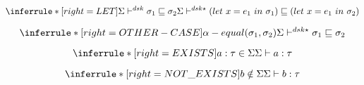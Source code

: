 \[
\inferrule*[right=LET]
{
\Sigma \polymorphic  \sigma_1 \sqsubseteq \sigma_2}
{\Sigma \polymorphicstar  (let\ x = e_1\ in\ \sigma_1) \sqsubseteq  (let\ x = e_1\ in\ \sigma_2) }
\]

\[
\inferrule*[right=OTHER-CASE]
{  \alpha-equal(\sigma_1, \sigma_2)  }
{ \Sigma \polymorphicstar \sigma_1 \sqsubseteq \sigma_2}
\]


\[
\inferrule*[right=EXISTS]
{ a:\tau \in \Sigma}
{ \Sigma \vdash a:\tau}
\]

\[
\inferrule*[right=NOT\_EXISTS]
{ b \notin \Sigma}
{ \Sigma \vdash b:\tau}
\]
